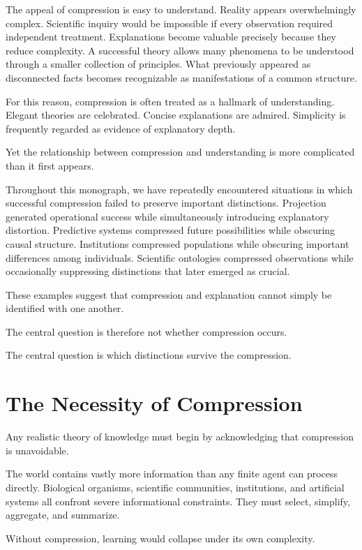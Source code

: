 \documentclass[11pt,oneside,openany]{book}
\begin{document}
The appeal of compression is easy to understand. Reality appears overwhelmingly complex. Scientific inquiry would be impossible if every observation required independent treatment. Explanations become valuable precisely because they reduce complexity. A successful theory allows many phenomena to be understood through a smaller collection of principles. What previously appeared as disconnected facts becomes recognizable as manifestations of a common structure.

For this reason, compression is often treated as a hallmark of understanding. Elegant theories are celebrated. Concise explanations are admired. Simplicity is frequently regarded as evidence of explanatory depth.

Yet the relationship between compression and understanding is more complicated than it first appears.

Throughout this monograph, we have repeatedly encountered situations in which successful compression failed to preserve important distinctions. Projection generated operational success while simultaneously introducing explanatory distortion. Predictive systems compressed future possibilities while obscuring causal structure. Institutions compressed populations while obscuring important differences among individuals. Scientific ontologies compressed observations while occasionally suppressing distinctions that later emerged as crucial.

These examples suggest that compression and explanation cannot simply be identified with one another.

The central question is therefore not whether compression occurs.

The central question is which distinctions survive the compression.

\section{The Necessity of Compression}

Any realistic theory of knowledge must begin by acknowledging that compression is unavoidable.

The world contains vastly more information than any finite agent can process directly. Biological organisms, scientific communities, institutions, and artificial systems all confront severe informational constraints. They must select, simplify, aggregate, and summarize.

Without compression, learning would collapse under its own complexity.
\end{document}
